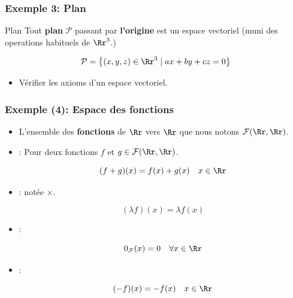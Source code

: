 \documentclass[dvipsnames]{beamer}
\begin{document}
\begin{frame}[t]
  \frametitle{Exemple 3: Plan}
 \begin{block}{Plan}
   \small
   Tout \textbf{plan} $\mathcal{P}$ passant par \textbf{\alert{l'origine}} est
   un espace vectoriel (muni des operations habituels de $\Rr^3$.)
 \end{block} 

     \begin{equation*}
       \mathcal{P} = \left\{ (x,y,z) \in \Rr^3\;|\; ax + by +cz=0\right\}
     \end{equation*}

     \begin{itemize}
       \item Vérifier les axioms d'un espace vectoriel.
     \end{itemize}
\end{frame}
\begin{frame}[t]
  \frametitle{Exemple (4): Espace des fonctions}

  \begin{itemize}
    \small
    \item L'ensemble des \textbf{fonctions} de $\Rr$ vers $\Rr$ que nous
      notons $\mathcal{F}(\Rr, \Rr)$.\\[8pt]

    \item {}: Pour deux fonctions $f$ et
      $g \in \mathcal{F}(\Rr,\Rr)$.

      \begin{equation*}
        (f+g)(x) = f(x) + g(x)\quad x \in \Rr
      \end{equation*}

    \item \textbf{}: notée $\times$.

      \begin{equation}
        (\lambda f)(x) = \lambda f(x)
      \end{equation}
    \item \textbf{} : 

      \begin{equation*}
        0_{\mathcal{F}}(x) = 0 \quad \forall x\in\Rr
      \end{equation*}

    \item \textbf{} : 

      \begin{equation*}
        (-f)(x) = -f(x) \quad x \in \Rr
      \end{equation*}
  \end{itemize}
\end{frame}
\end{document}
